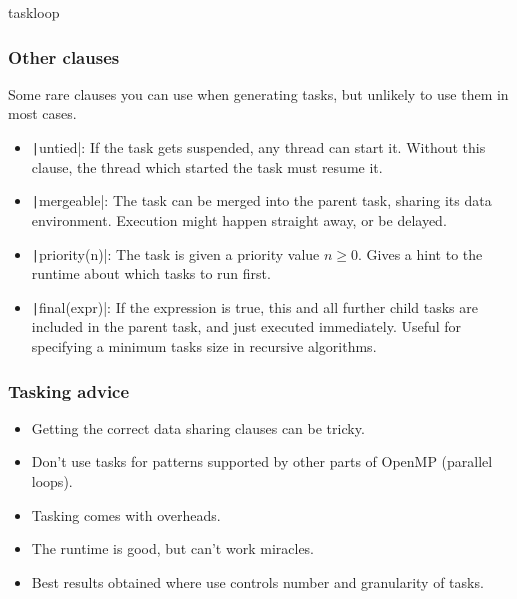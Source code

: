 \documentclass{beamer}
\begin{document}
\begin{frame}
taskloop
\end{frame}
\begin{frame}
\frametitle{Other clauses}
Some rare clauses you can use when generating tasks, but unlikely to use them in most cases.
\begin{itemize}
  \item \texttt|untied|: If the task gets suspended, any thread can start it. Without this clause, the thread which started the task must resume it.
  \item \texttt|mergeable|: The task can be merged into the parent task, sharing its data environment. Execution might happen straight away, or be delayed.
  \item \texttt|priority(n)|: The task is given a priority value $n \ge 0$. Gives a hint to the runtime about which tasks to run first.
  \item \texttt|final(expr)|: If the expression is true, this and all further child tasks are included in the parent task, and just executed immediately. Useful for specifying a minimum tasks size in recursive algorithms.
\end{itemize}
\end{frame}
\begin{frame}
\frametitle{Tasking advice}
\begin{itemize}
  \item Getting the correct data sharing clauses can be tricky.
  \item Don't use tasks for patterns supported by other parts of OpenMP (parallel loops).
  \item Tasking comes with overheads.
  \item The runtime is good, but can't work miracles.
  \item Best results obtained where use controls number and granularity of tasks.
\end{itemize}
\end{frame}

\end{document}
